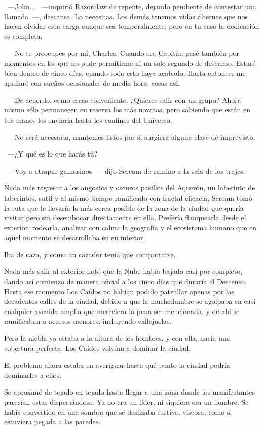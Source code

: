 ~---John\dots\ ~---inquirió Razorclaw de repente, dejando pendiente de contestar una llamada~---, descansa. Lo necesitas. Los demás tenemos vidas alternas que nos hacen olvidar esta carga aunque sea temporalmente, pero en tu caso la dedicación es completa.

~---No te preocupes por mí, Charles. Cuando era Capitán pasé también por momentos en los que no pude permitirme ni un solo segundo de descanso. Estaré bien dentro de cinco días, cuando todo esto haya acabado. Hasta entonces me apañaré con sueños ocasionales de media hora, cosas así.

~---De acuerdo, como creas conveniente. ¿Quieres salir con un grupo? Ahora mismo sólo permanecen en reserva los más novatos, pero sabiendo que están en tus manos les enviaría hasta los confines del Universo.

~---No será necesario, mantenles listos por si surgiera alguna clase de imprevisto.

~---¿Y qué es lo que harás tú?

~---Voy a atrapar gamusinos ~---dijo Scream de camino a la sala de los trajes.

\parbreak
Nada más regresar a los angostos y oscuros pasillos del Aquerón, un laberinto de laberintos, sutil y al mismo tiempo ramificado con fractal eficacia, Scream tomó la ruta que le llevaría lo más cerca posible de la zona de la ciudad que quería visitar pero sin desembocar directamente en ella. Prefería flanquearla desde el exterior, rodearla, analizar con calma la geografía y el ecosistema humano que en aquel momento se desarrollaba en su interior.

Iba de caza, y como un cazador tenía que comportarse.

Nada más salir al exterior notó que la Nube había bajado casi por completo, dando así comienzo de manera oficial a los cinco días que duraría el Descenso. Hasta ese momento Los Caídos no habían podido patrullar apenas por las decadentes calles de la ciudad, debido a que la muchedumbre se agolpaba en casi cualquier avenida amplia que mereciera la pena ser mencionada, y de ahí se ramificaban a accesos menores, incluyendo callejuelas.

Pero la niebla ya estaba a la altura de los hombres, y con ella, nacía una cobertura perfecta. Los Caídos volvían a dominar la ciudad.

El problema ahora estaba en averiguar hasta qué punto la ciudad podría dominarles a ellos.

Se aproximó de tejado en tejado hasta llegar a una zona donde los manifestantes parecían estar dispersándose. Ya no era un líder, ni siquiera era un hombre. Se había convertido en una sombra que se deslizaba furtiva, viscosa, como si estuviera pegada a las paredes.

